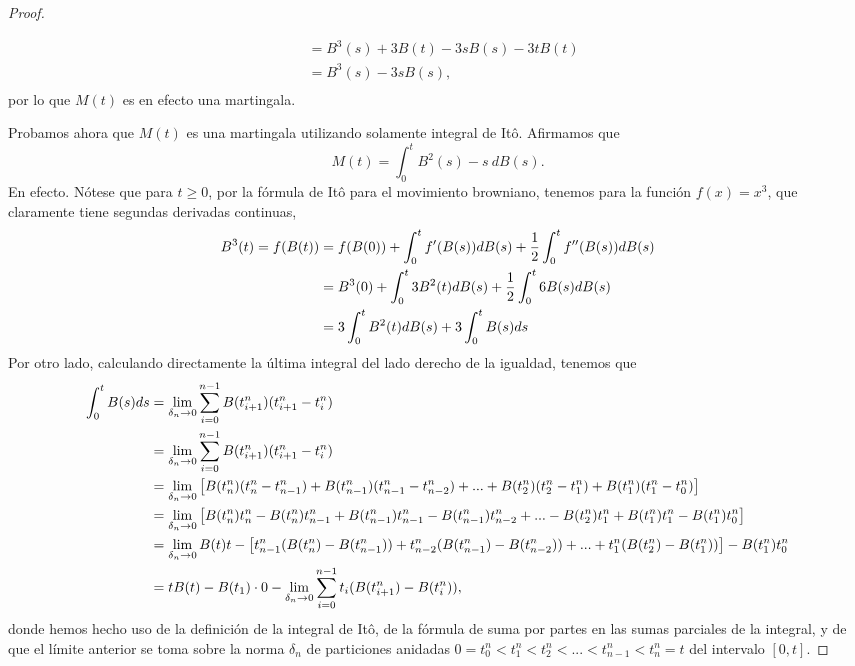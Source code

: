 \documentclass[letterpaper]{article}
\renewcommand{\to}{\rightarrow}
\newcommand{\1}{\mathds{1}}
\theoremstyle{definition}
\theoremstyle{definition}
\theoremstyle{definition}
\theoremstyle{definition}
\theoremstyle{definition}
\begin{document}
\begin{enumerate}
\begin{proof}
\begin{enumerate}
\begin{align*}
            &=B^3(s)+3B(t)-3sB(s)-3tB(t)\\
            &=B^3(s)-3sB(s),\\
        \end{align*}
        por lo que $M(t)$ es en efecto una martingala.
      \end{enumerate} 
      Probamos ahora que $M(t)$ es una martingala utilizando solamente integral de Itô. Afirmamos que
      \[
      M(t)=\int_{0}^tB^2(s)-s \ dB(s).
      \]
      En efecto. Nótese que para $t\geq0$, por la fórmula de Itô para el movimiento browniano, tenemos para
      la función $f(x)=x^3$, que claramente tiene segundas derivadas continuas, 
      \begin{align} \notag
        B^3(t)=f(B(t))&=f(B(0))+\int_{0}^{t}f'(B(s))dB(s)+\frac{1}{2}\int_{0}^{t}f''(B(s))dB(s)\\ \notag
        &=B^3(0)+\int_{0}^t3B^2(t)dB(s)+\frac{1}{2}\int_{0}^t6B(s)dB(s)\\ 
        &=3\int_{0}^{t}B^2(t)dB(s)+3\int_{0}^{t}B(s)ds \label{ec0}
        \end{align}
        Por otro lado, calculando directamente la última integral del lado derecho de la igualdad, tenemos que 
        \begin{align}
            \int_{0}^{t}B(s)ds&=\lim_{\delta_n\to 0}\sum_{i=0}^{n-1}B(t_{i+1}^n)(t_{i+1}^n-t_i^n)\notag\\
            &=\lim_{\delta_n\to 0}\sum_{i=0}^{n-1}B(t_{i+1}^n)(t_{i+1}^n-t_i^n)\notag\\
            &=\lim_{\delta_n\to 0}\left[B(t_n^n)(t_n^n-t_{n-1}^n)+B(t_{n-1}^n)(t_{n-1}^n-t_{n-2}^n)+...+B(t_{2}^n)(t_{2}^n-t_{1}^n)+B(t_{1}^n)(t_{1}^n-t_{0}^n)\right]\notag\\
            &=\lim_{\delta_n\to 0}\left[B(t_n^n)t_{n}^n-B(t_{n}^n)t_{n-1}^n+B(t_{n-1}^n)t_{n-1}^n-B(t_{n-1}^n)t_{n-2}^n+...-B(t_{2}^n)t_{1}^n+B(t_{1}^n)t_{1}^n-B(t_{1}^n)t_{0}^n\right]\notag\\
            &=\lim_{\delta_n\to 0}B(t)t-\left[t_{n-1}^n(B(t_{n}^n)-B(t_{n-1}^n))+t_{n-2}^n(B(t_{n-1}^n)-B(t_{n-2}^n))+...+t_{1}^n(B(t_{2}^n)-B(t_{1}^n))\right]-B(t_{1}^n)t_{0}^n\notag\\
            &=tB(t)-B(t_1)\cdot0-\lim_{\delta_n\to 0}\sum_{i=0}^{n-1}t_{i}(B(t_{i+1}^n)-B(t_{i}^n)), \label{ec1}
        \end{align}
        donde hemos hecho uso de la definición de la integral de Itô, de la fórmula de suma por partes en las sumas parciales de la integral, y de que el límite anterior se 
        toma sobre la norma $\delta_n$ de particiones anidadas $0=t_0^n<t_1^n<t_2^n<...<t_{n-1}^n<t_{n}^n=t$ del intervalo $[0,t]$. 


\end{proof}
\end{enumerate}
\end{document}
